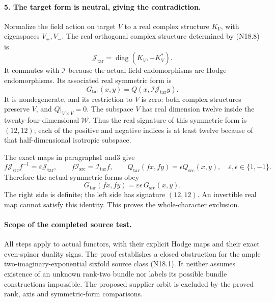 \paragraph{5. The target form is neutral, giving the contradiction.}
Normalize the field action on target $V$ to a real complex
structure $K_V$, with eigenspaces $V_+,V_-$. The real
orthogonal complex structure determined by (N18.8) is
\begin{equation}
 \mathcal J_{\mathrm{tar}}=\operatorname{diag}(K_V,-K_V^*).
                                                        \tag{N18.11}
\end{equation}
It commutes with $\mathcal I$ because the actual field
endomorphisms are Hodge endomorphisms. Its associated real
symmetric form is
\[
       G_{\mathrm{tar}}(x,y)
                      =Q(x,\mathcal I\mathcal J_{\mathrm{tar}}y).
\]
It is nondegenerate, and its restriction to $V$ is zero:
both complex structures preserve $V$, and $Q|_{V\times V}=0$.
The subspace $V$ has real dimension twelve inside the
twenty-four-dimensional $\mathcal W$. Thus the real
signature of this symmetric form is $(12,12)$; each of
the positive and negative indices is at least twelve
because of that half-dimensional isotropic subspace.

The exact maps in paragraphs1 and3 give
\[
 f\mathcal J_{\mathrm{src}}f^{-1}
       =\varepsilon\mathcal J_{\mathrm{tar}},\qquad
 f\mathcal I_{\mathrm{src}}=\mathcal I_{\mathrm{tar}}f,\qquad
 Q_{\mathrm{tar}}(fx,fy)=\epsilon Q_{\mathrm{src}}(x,y),
 \quad\varepsilon,\epsilon\in\{1,-1\}.
\]
Therefore the actual symmetric
forms obey
\begin{equation}
       G_{\mathrm{tar}}(fx,fy)
             =\varepsilon\epsilon\,G_{\mathrm{src}}(x,y).
                                                        \tag{N18.12}
\end{equation}
The right side is definite; the left side has signature
$(12,12)$. An invertible real map cannot satisfy this
identity. This proves the whole-character exclusion.

\paragraph{Scope of the completed source test.}
All steps apply to actual functors, with their explicit
Hodge maps and their exact even-spinor duality signs.
The proof establishes a closed obstruction for the ample
two-imaginary-exponential sixfold source class (N18.1).
It neither assumes existence of an unknown rank-two bundle
nor labels its possible bundle constructions impossible.
The proposed supplier orbit is excluded by the proved
rank, axis and symmetric-form comparisons.
